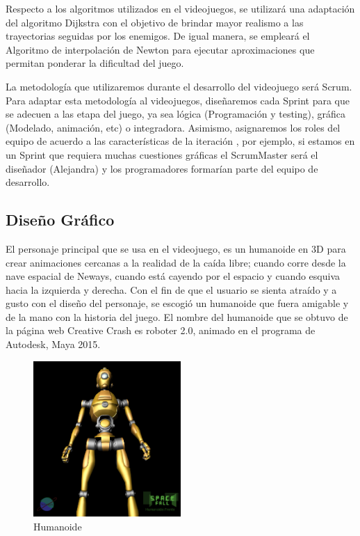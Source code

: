 \documentclass[12pt, conference]{IEEEtran}
\begin{document}
Respecto a los algoritmos utilizados en el videojuegos, se utilizar\'{a} una adaptaci\'{o}n del algoritmo Dijkstra con el objetivo de brindar mayor realismo a las trayectorias seguidas por los enemigos. De igual manera, se emplear\'{a} el Algoritmo de interpolaci\'{o}n de Newton para ejecutar aproximaciones que permitan ponderar la dificultad del juego.

La metodolog\'{i}a que utilizaremos durante el desarrollo del videojuego ser\'{a} Scrum. Para adaptar esta metodolog\'{i}a al videojuegos, dise\~{n}aremos cada Sprint para que se adecuen a las etapa del juego, ya sea l\'{o}gica (Programaci\'{o}n y testing), gr\'{a}fica (Modelado, animaci\'{o}n, etc) o integradora. Asimismo, asignaremos los roles del equipo de acuerdo a las caracter\'{i}sticas de la iteraci\'{o}n , por ejemplo, si estamos en un Sprint que requiera muchas cuestiones gr\'{a}ficas el ScrumMaster ser\'{a} el dise\~{n}ador (Alejandra) y los programadores formar\'{i}an parte del equipo de desarrollo.

\subsection{Dise\~{n}o Gr\'{a}fico}

El personaje principal que se usa en el videojuego, es un humanoide en 3D para crear animaciones cercanas a la realidad de la ca\'{i}da libre; cuando corre desde la nave espacial de Neways, cuando est\'{a} cayendo por el espacio y cuando esquiva hacia la izquierda y derecha. Con el fin de que el usuario se sienta atra\'{i}do y a gusto con el dise\~{n}o del personaje, se escogi\'{o} un humanoide que fuera amigable y de la mano con la historia del juego. El nombre del humanoide que se obtuvo de la p\'{a}gina web Creative Crash es roboter 2.0, animado en el programa de Autodesk, Maya 2015. 

\begin{figure}[h]
\caption{Humanoide}
\centering
\includegraphics[width=0.5\textwidth]{robotfront}
\end{figure}
\end{document}
